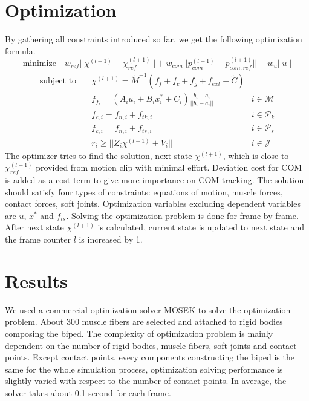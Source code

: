 \documentclass[master,english,final]{kaist-ucs}
\begin{document}
\chapter{Optimization}
By gathering all constraints introduced so far, we get the following optimization formula.
\begin{equation}
\text{minimize} \quad w_{ref} || \chi^{(l+1)} - \chi^{(l+1)}_{ref} || + w_{com} || p^{(l+1)}_{com} - p^{(l+1)}_{com,ref} || + w_u || u ||
\end{equation}
\begin{align}
\text{subject to} & \quad \chi^{(l+1)} = \tilde{M}^{-1} (f_f + f_c + f_g + f_{ext} - \tilde{C})     &                      \\
                  & \quad f_{f_i} = (A_i u_i + B_i x_i^* + C_i) \frac{b_i - a_i}{ || b_i - a_i || } & i \in \mathcal{M}    \\
                  & \quad f_{c,i} = f_{n,i} + f_{tk, i}                                             & i \in \mathcal{P}_k  \\
                  & \quad f_{c,i} = f_{n,i} + f_{ts, i}                                             & i \in \mathcal{P}_s  \\
                  & \quad r_i \geq || Z_i \chi^{(l+1)} + V_i ||                                     & i \in \mathcal{J}
\end{align}
The optimizer tries to find the solution, next state $\chi^{(l+1)}$, which is
close to $\chi^{(l+1)}_{ref}$ provided from motion clip with minimal effort.
Deviation cost for COM is added as a cost term to give more importance on COM tracking.
The solution should satisfy four types of constraints:
equations of motion, muscle forces, contact forces, soft joints.
Optimization variables excluding dependent variables are $u$, $x^*$ and $f_{ts}$.
Solving the optimization problem is done for frame by frame.
After next state $\chi^{(l+1)}$ is calculated, current state is updated to
next state and the frame counter $l$ is increased by 1.

\chapter{Results}
We used a commercial optimization solver MOSEK to solve
the optimization problem.
About 300 muscle fibers are selected and attached to
rigid bodies composing the biped.
The complexity of optimization problem is mainly
dependent on the number of rigid bodies, muscle fibers, soft joints
and contact points. Except contact points, every components
constructing the biped is the same for the whole simulation process,
optimization solving performance is slightly varied with respect
to the number of contact points. In average, the solver takes
about 0.1 second for each frame.
\end{document}
